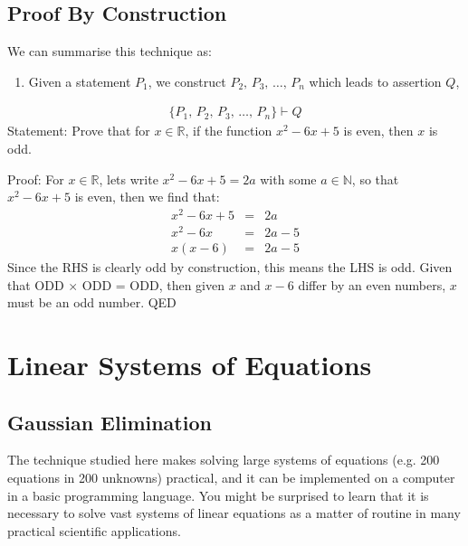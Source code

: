 \documentclass[letterpaper,10pt,english]{jupyterBook}
\begin{document}
\section{Proof By Construction}
\label{\detokenize{ProofLogic/methodsofproof:proof-by-construction}}
\sphinxAtStartPar
We can summarise this technique as:
\begin{enumerate}
%
\item {} 
\sphinxAtStartPar
Given a statement \(P_1\), we construct  \(P_2,\,P_3,\,\dots,\,P_n\) which leads to assertion \(Q\),

\end{enumerate}
\begin{equation*}
\begin{split}    \{P_1,\,P_2,\,P_3,\,\dots,\,P_n\} \vdash Q\end{split}
\end{equation*}
\sphinxAtStartPar
Statement: Prove that for \(x \in \mathbb{R}\), if the function \(x^2 - 6x + 5\) is even, then \(x\) is odd.

\sphinxAtStartPar
Proof: For \(x \in \mathbb{R}\), lets write \(x^2 - 6x + 5 = 2a\) with some \(a \in \mathbb{N}\), so that \(x^2 - 6x + 5\) is even, then we find that:
\begin{equation*}
\begin{split}x^2 - 6x + 5 &=& 2a  \\
x^2 - 6x &=& 2a - 5 \\
x(x-6) &=& 2a - 5\end{split}
\end{equation*}
\sphinxAtStartPar
Since the RHS is clearly odd by construction, this means the LHS is odd.  Given that ODD \(\times\) ODD = ODD, then given \(x\) and \(x-6\) differ by an even numbers, \(x\) must be an odd number. QED


\chapter{Linear Systems of Equations}
\label{\detokenize{LinearAlgebra/linear_systems_matrices/echelon_form:linear-systems-of-equations}}\label{\detokenize{LinearAlgebra/linear_systems_matrices/echelon_form::doc}}

\section{Gaussian Elimination}
\label{\detokenize{LinearAlgebra/linear_systems_matrices/echelon_form:gaussian-elimination}}
\sphinxAtStartPar
The technique studied here makes solving large systems of equations (e.g. 200 equations in 200 unknowns) practical, and it can be implemented on a computer in a basic programming language. You might be surprised to learn that it is necessary to solve vast systems of linear equations as a matter of routine in many practical scientific applications.
\end{document}
